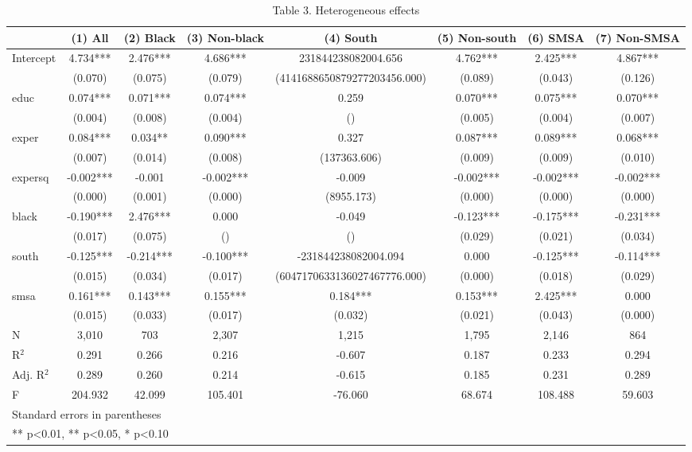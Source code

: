 \begin{table}[htbp]
\centering
\caption{Table 3. Heterogeneous effects}
\begin{tabular}{lccccccc}
\hline\hline
 & (1) All & (2) Black & (3) Non-black & (4) South & (5) Non-south & (6) SMSA & (7) Non-SMSA \\
\hline
Intercept & 4.734*** & 2.476*** & 4.686*** & 231844238082004.656 & 4.762*** & 2.425*** & 4.867*** \\
 & (0.070) & (0.075) & (0.079) & (4141688650879277203456.000) & (0.089) & (0.043) & (0.126) \\
educ & 0.074*** & 0.071*** & 0.074*** & 0.259 & 0.070*** & 0.075*** & 0.070*** \\
 & (0.004) & (0.008) & (0.004) & () & (0.005) & (0.004) & (0.007) \\
exper & 0.084*** & 0.034** & 0.090*** & 0.327 & 0.087*** & 0.089*** & 0.068*** \\
 & (0.007) & (0.014) & (0.008) & (137363.606) & (0.009) & (0.009) & (0.010) \\
expersq & -0.002*** & -0.001 & -0.002*** & -0.009 & -0.002*** & -0.002*** & -0.002*** \\
 & (0.000) & (0.001) & (0.000) & (8955.173) & (0.000) & (0.000) & (0.000) \\
black & -0.190*** & 2.476*** & 0.000 & -0.049 & -0.123*** & -0.175*** & -0.231*** \\
 & (0.017) & (0.075) & () & () & (0.029) & (0.021) & (0.034) \\
south & -0.125*** & -0.214*** & -0.100*** & -231844238082004.094 & 0.000 & -0.125*** & -0.114*** \\
 & (0.015) & (0.034) & (0.017) & (6047170633136027467776.000) & (0.000) & (0.018) & (0.029) \\
smsa & 0.161*** & 0.143*** & 0.155*** & 0.184*** & 0.153*** & 2.425*** & 0.000 \\
 & (0.015) & (0.033) & (0.017) & (0.032) & (0.021) & (0.043) & (0.000) \\
\hline
N & 3,010 & 703 & 2,307 & 1,215 & 1,795 & 2,146 & 864 \\
R$^2$ & 0.291 & 0.266 & 0.216 & -0.607 & 0.187 & 0.233 & 0.294 \\
Adj. R$^2$ & 0.289 & 0.260 & 0.214 & -0.615 & 0.185 & 0.231 & 0.289 \\
F & 204.932 & 42.099 & 105.401 & -76.060 & 68.674 & 108.488 & 59.603 \\
\hline\hline
\multicolumn{8}{l}{\footnotesize Standard errors in parentheses} \\
\multicolumn{8}{l}{\footnotesize *** p<0.01, ** p<0.05, * p<0.10} \\
\end{tabular}
\end{table}

